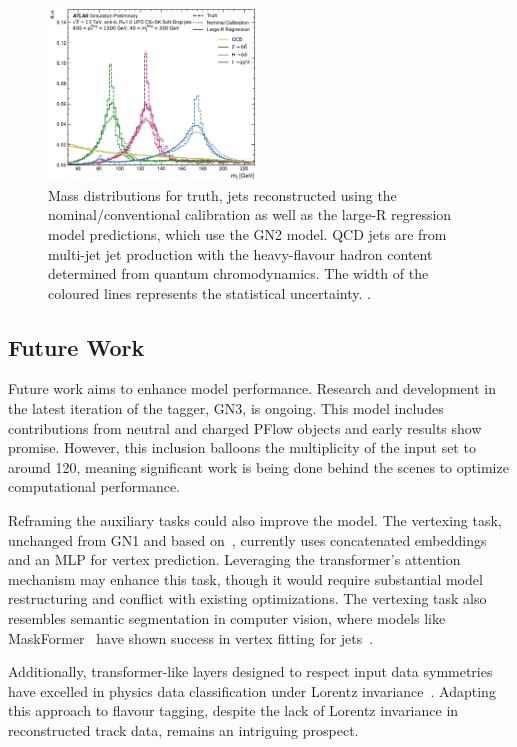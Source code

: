 \begin{figure}
    \centering
    \includegraphics[width=0.49\textwidth]{figures/flavour_tagging/fig_10.pdf}
    \caption{Mass distributions for truth, jets reconstructed using the nominal/conventional calibration as well as the large-R regression model predictions, which use the GN2 model. QCD jets are from multi-jet jet production with the heavy-flavour hadron content determined from quantum chromodynamics. The width of the coloured lines represents the statistical uncertainty. .}
    \label{fig:gn2calib}
\end{figure}

\subsection{Future Work}

Future work aims to enhance model performance.
Research and development in the latest iteration of the tagger, GN3, is ongoing.
This model includes contributions from neutral and charged PFlow objects and early results show promise.
However, this inclusion balloons the multiplicity of the input set to around 120, meaning significant work is being done behind the scenes to optimize computational performance.

Reframing the auxiliary tasks could also improve the model.
The vertexing task, unchanged from GN1 and based on~\textcite{SecondaryVertexFinding}, currently uses concatenated embeddings and an MLP for vertex prediction.
Leveraging the transformer's attention mechanism may enhance this task, though it would require substantial model restructuring and conflict with existing optimizations.
The vertexing task also resembles semantic segmentation in computer vision, where models like MaskFormer~\cite{MaskFormer} have shown success in vertex fitting for jets~\cite{MaskFormerJets}.

Additionally, transformer-like layers designed to respect input data symmetries~\cite{GeometricAlgebraTransformer} have excelled in physics data classification under Lorentz invariance~\cite{LorentzEquivariantGeometricAlgebra}.
Adapting this approach to flavour tagging, despite the lack of Lorentz invariance in reconstructed track data, remains an intriguing prospect.





